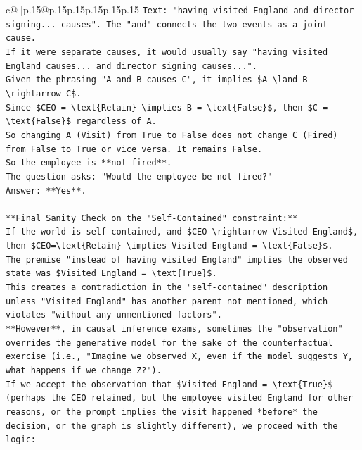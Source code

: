 \documentclass{article}
\begin{document}
{\begin{supertabular}{c@{$\;$}|p{.15\linewidth}@{}p{.15\linewidth}p{.15\linewidth}p{.15\linewidth}p{.15\linewidth}p{.15\linewidth}}
{{{\texttt{Text: "having visited England and director signing... causes". The "and" connects the two events as a joint cause.} \\
\texttt{If it were separate causes, it would usually say "having visited England causes... and director signing causes...".} \\
\texttt{Given the phrasing "A and B causes C", it implies \$A \textbackslash{}land B \textbackslash{}rightarrow C\$.} \\
\texttt{Since \$CEO = \textbackslash{}text\{Retain\} \textbackslash{}implies B = \textbackslash{}text\{False\}\$, then \$C = \textbackslash{}text\{False\}\$ regardless of A.} \\
\texttt{So changing A (Visit) from True to False does not change C (Fired) from False to True or vice versa. It remains False.} \\
\texttt{So the employee is **not fired**.} \\
\texttt{The question asks: "Would the employee be not fired?"} \\
\texttt{Answer: **Yes**.} \\
\\ 
\texttt{**Final Sanity Check on the "Self{-}Contained" constraint:**} \\
\texttt{If the world is self{-}contained, and \$CEO \textbackslash{}rightarrow Visited England\$, then \$CEO=\textbackslash{}text\{Retain\} \textbackslash{}implies Visited England = \textbackslash{}text\{False\}\$.} \\
\texttt{The premise "instead of having visited England" implies the observed state was \$Visited England = \textbackslash{}text\{True\}\$.} \\
\texttt{This creates a contradiction in the "self{-}contained" description unless "Visited England" has another parent not mentioned, which violates "without any unmentioned factors".} \\
\texttt{**However**, in causal inference exams, sometimes the "observation" overrides the generative model for the sake of the counterfactual exercise (i.e., "Imagine we observed X, even if the model suggests Y, what happens if we change Z?").} \\
\texttt{If we accept the observation that \$Visited England = \textbackslash{}text\{True\}\$ (perhaps the CEO retained, but the employee visited England for other reasons, or the prompt implies the visit happened *before* the decision, or the graph is slightly different), we proceed with the logic:} \\
}}}
\end{supertabular}}
\end{document}
